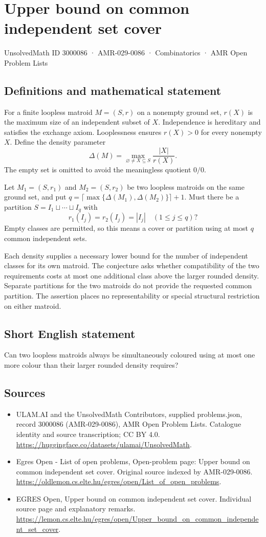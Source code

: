 \documentclass[11pt,a4paper]{article}
\begin{document}
\section*{Upper bound on common independent set cover}\label{3000086}
{\small UnsolvedMath ID 3000086 · AMR-029-0086 · Combinatorics · AMR Open Problem Lists}
\subsection{Definitions and mathematical statement}
For a finite loopless matroid $M=(S,r)$ on a nonempty ground set,
$r(X)$ is the maximum size of an independent subset of $X$.
Independence is hereditary and satisfies the exchange axiom.
Looplessness ensures $r(X)>0$ for every nonempty $X$.
Define the density parameter
\[
                              \Delta(M)=
                     \max_{\varnothing\ne X\subseteq S}\frac{|X|}{r(X)}.
\]
The empty set is omitted to avoid the meaningless quotient $0/0$.

Let $M_1=(S,r_1)$ and $M_2=(S,r_2)$ be two loopless matroids
on the same ground set, and put
$q=\lceil\max\{\Delta(M_1),\Delta(M_2)\}\rceil+1$.
Must there be a partition $S=I_1\sqcup\cdots\sqcup I_q$ with
\[
                             r_1(I_j)=r_2(I_j)=|I_j|
                                      \quad(1\le j\le q)?
\]
Empty classes are permitted, so this means a cover or partition
using at most $q$ common independent sets.

Each density supplies a necessary lower bound for the number
of independent classes for its own matroid. The conjecture asks
whether compatibility of the two requirements costs at most one
additional class above the larger rounded density. Separate
partitions for the two matroids do not provide the requested
common partition. The assertion places no representability or
special structural restriction on either matroid.
\subsection{Short English statement}
Can two loopless matroids always be simultaneously coloured
using at most one more colour than their larger rounded density requires?
\subsection{Sources}
\begin{itemize}
\item[S1] ULAM.AI and the UnsolvedMath Contributors, supplied problems.json, record 3000086 (AMR-029-0086), AMR Open Problem Lists. Catalogue identity and source transcription; CC BY 4.0.
\url{https://huggingface.co/datasets/ulamai/UnsolvedMath}.
\item[S2] Egres Open - List of open problems, Open-problem page: Upper bound on common independent set cover. Original source indexed by AMR-029-0086.
\url{https://oldlemon.cs.elte.hu/egres/open/List_of_open_problems}.
\item[S3] EGRES Open, Upper bound on common independent set cover. Individual source page and explanatory remarks.
\url{https://lemon.cs.elte.hu/egres/open/Upper_bound_on_common_independent_set_cover}.
\end{itemize}
\end{document}
